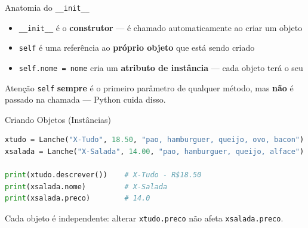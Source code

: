 \documentclass[aspectratio=169]{beamer}
\begin{document}
\begin{frame}{Anatomia do \texttt{\_\_init\_\_}}
  \begin{itemize}
    \item \texttt{\_\_init\_\_} é o \textbf{construtor} --- é chamado
          automaticamente ao criar um objeto
    \item \texttt{self} é uma referência ao \textbf{próprio objeto}
          que está sendo criado
    \item \texttt{self.nome = nome} cria um \textbf{atributo de instância}
          --- cada objeto terá o seu
  \end{itemize}

  \vspace{0.3cm}
  \begin{block}{Atenção}
    \texttt{self} \textbf{sempre} é o primeiro parâmetro de qualquer método,
    mas \textbf{não} é passado na chamada --- Python cuida disso.
  \end{block}
\end{frame}

\begin{frame}[fragile]{Criando Objetos (Instâncias)}
  \begin{lstlisting}[language=Python]
xtudo = Lanche("X-Tudo", 18.50, "pao, hamburguer, queijo, ovo, bacon")
xsalada = Lanche("X-Salada", 14.00, "pao, hamburguer, queijo, alface")

print(xtudo.descrever())    # X-Tudo - R$18.50
print(xsalada.nome)         # X-Salada
print(xsalada.preco)        # 14.0
  \end{lstlisting}

  \vspace{0.3cm}
  Cada objeto é independente: alterar \texttt{xtudo.preco} não afeta
  \texttt{xsalada.preco}.
\end{frame}
\end{document}
